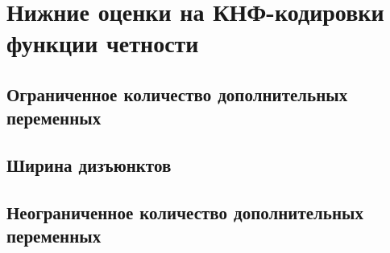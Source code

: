 \section{Нижние оценки на КНФ-кодировки функции четности}

\subsection{Ограниченное количество дополнительных переменных}
\subsection{Ширина дизъюнктов}
\subsection{Неограниченное количество дополнительных переменных}